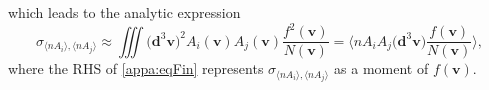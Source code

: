   which leads to the analytic expression
    \begin{equation} \label{appa:eqFin}
      \sigma_{\langle n A_i \rangle,\langle n A_j\rangle } \approx \iiint \big ( \mathbf{d}^3 \mathbf{v} \big )^2 A_i (\mathbf{v}) A_j (\mathbf{v}) \frac{f^2(\mathbf{v})}{N(\mathbf{v})} = \Bigg \langle n A_i A_j \big (\mathbf{d}^3 \mathbf{v} \big ) \frac{f(\mathbf{v})}{N(\mathbf{v})} \Bigg \rangle,
    \end{equation}
  where the RHS of \ref{appa:eqFin} represents $\sigma_{\langle n A_i
    \rangle,\langle n A_j\rangle }$ as a moment of $f(\mathbf{v})$.



